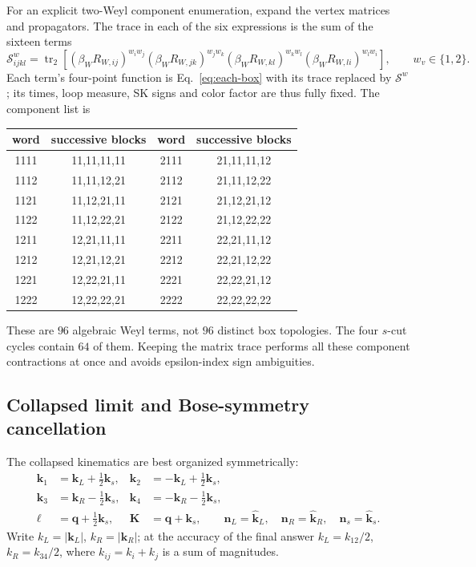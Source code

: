 \documentclass[a4paper,12pt]{article}
\newcommand{\tr}{\operatorname{tr}}
\newcommand{\bq}{\bm q}
\newcommand{\bk}{\bm k}
\begin{document}
For an explicit two-Weyl component enumeration, expand the vertex matrices and propagators.
The trace in each of the six expressions is the sum of the sixteen terms
\begin{equation}
 \mathcal S^{w}_{ijkl}=
 \tr_2[(\beta_W R_{W,ij})^{w_iw_j}(\beta_W R_{W,jk})^{w_jw_k}
 (\beta_W R_{W,kl})^{w_kw_l}(\beta_W R_{W,li})^{w_lw_i}],\qquad w_v\in\{1,2\}.
 \label{eq:weyl-components}
\end{equation}
Each term's four-point function is Eq.~\eqref{eq:each-box} with its trace replaced
by $\mathcal S^w$; its times, loop measure, SK signs and color factor are thus
fully fixed. The component list is
\begin{center}\small
\begin{tabular}{cc@{\qquad}cc}
\toprule
word & successive blocks & word & successive blocks\\\midrule
1111 & 11,11,11,11 & 2111 & 21,11,11,12\\
1112 & 11,11,12,21 & 2112 & 21,11,12,22\\
1121 & 11,12,21,11 & 2121 & 21,12,21,12\\
1122 & 11,12,22,21 & 2122 & 21,12,22,22\\
1211 & 12,21,11,11 & 2211 & 22,21,11,12\\
1212 & 12,21,12,21 & 2212 & 22,21,12,22\\
1221 & 12,22,21,11 & 2221 & 22,22,21,12\\
1222 & 12,22,22,21 & 2222 & 22,22,22,22\\\bottomrule
\end{tabular}\end{center}
These are $96$ algebraic Weyl terms, not $96$ distinct box topologies.
The four $s$-cut cycles contain $64$ of them. Keeping the matrix trace performs
all these component contractions at once and avoids epsilon-index sign ambiguities.

\subsection{Collapsed limit and Bose-symmetry cancellation}
The collapsed kinematics are best organized symmetrically:
\begin{align}
 \bk_1&=\bm k_L+\tfrac12\bk_s,&\bk_2&=-\bm k_L+\tfrac12\bk_s,\\
 \bk_3&=\bm k_R-\tfrac12\bk_s,&\bk_4&=-\bm k_R-\tfrac12\bk_s,\\
 \bm\ell&=\bq+\tfrac12\bk_s,&\bm K&=\bq+\bk_s,\qquad
 \bm n_L=\hat{\bm k}_L,\quad\bm n_R=\hat{\bm k}_R,\quad\bm n_s=\hat{\bk}_s.
 \label{eq:central}
\end{align}
Write $k_L=|\bm k_L|$, $k_R=|\bm k_R|$; at the accuracy of the final answer
$k_L=k_{12}/2$, $k_R=k_{34}/2$, where $k_{ij}=k_i+k_j$ is a sum of magnitudes.
\end{document}
